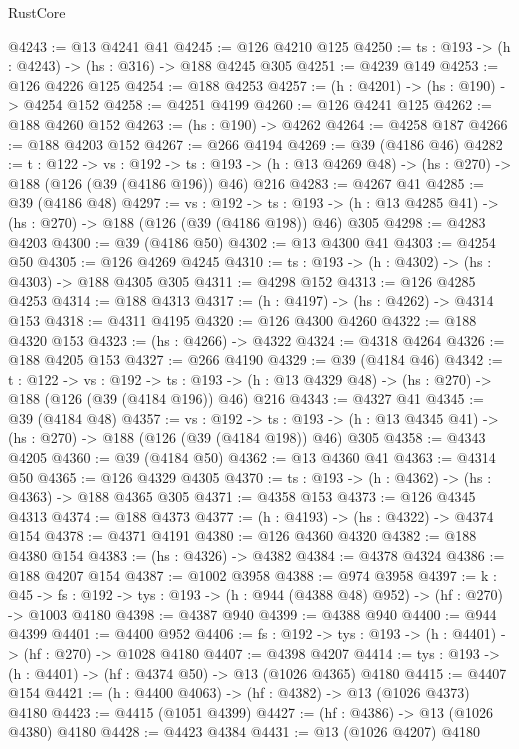 \begin{lexlean}{RustCore}
\begin{coremodule}
@4243 := @13 @4241 @41
@4245 := @126 @4210 @125
@4250 := {ts : @193} -> (h : @4243) -> (hs : @316) -> @188 @4245 @305
@4251 := @4239 @149
@4253 := @126 @4226 @125
@4254 := @188 @4253
@4257 := (h : @4201) -> (hs : @190) -> @4254 @152
@4258 := @4251 @4199
@4260 := @126 @4241 @125
@4262 := @188 @4260 @152
@4263 := (hs : @190) -> @4262
@4264 := @4258 @187
@4266 := @188 @4203 @152
@4267 := @266 @4194
@4269 := @39 (@4186 @46)
@4282 := {t : @122} ->
  {vs : @192} ->
  {ts : @193} -> (h : @13 @4269 @48) -> (hs : @270) -> @188 (@126 (@39 (@4186 @196)) @46) @216
@4283 := @4267 @41
@4285 := @39 (@4186 @48)
@4297 := {vs : @192} ->
  {ts : @193} -> (h : @13 @4285 @41) -> (hs : @270) -> @188 (@126 (@39 (@4186 @198)) @46) @305
@4298 := @4283 @4203
@4300 := @39 (@4186 @50)
@4302 := @13 @4300 @41
@4303 := @4254 @50
@4305 := @126 @4269 @4245
@4310 := {ts : @193} -> (h : @4302) -> (hs : @4303) -> @188 @4305 @305
@4311 := @4298 @152
@4313 := @126 @4285 @4253
@4314 := @188 @4313
@4317 := (h : @4197) -> (hs : @4262) -> @4314 @153
@4318 := @4311 @4195
@4320 := @126 @4300 @4260
@4322 := @188 @4320 @153
@4323 := (hs : @4266) -> @4322
@4324 := @4318 @4264
@4326 := @188 @4205 @153
@4327 := @266 @4190
@4329 := @39 (@4184 @46)
@4342 := {t : @122} ->
  {vs : @192} ->
  {ts : @193} -> (h : @13 @4329 @48) -> (hs : @270) -> @188 (@126 (@39 (@4184 @196)) @46) @216
@4343 := @4327 @41
@4345 := @39 (@4184 @48)
@4357 := {vs : @192} ->
  {ts : @193} -> (h : @13 @4345 @41) -> (hs : @270) -> @188 (@126 (@39 (@4184 @198)) @46) @305
@4358 := @4343 @4205
@4360 := @39 (@4184 @50)
@4362 := @13 @4360 @41
@4363 := @4314 @50
@4365 := @126 @4329 @4305
@4370 := {ts : @193} -> (h : @4362) -> (hs : @4363) -> @188 @4365 @305
@4371 := @4358 @153
@4373 := @126 @4345 @4313
@4374 := @188 @4373
@4377 := (h : @4193) -> (hs : @4322) -> @4374 @154
@4378 := @4371 @4191
@4380 := @126 @4360 @4320
@4382 := @188 @4380 @154
@4383 := (hs : @4326) -> @4382
@4384 := @4378 @4324
@4386 := @188 @4207 @154
@4387 := @1002 @3958
@4388 := @974 @3958
@4397 := {k : @45} ->
  {fs : @192} -> {tys : @193} -> (h : @944 (@4388 @48) @952) -> (hf : @270) -> @1003 @4180
@4398 := @4387 @940
@4399 := @4388 @940
@4400 := @944 @4399
@4401 := @4400 @952
@4406 := {fs : @192} -> {tys : @193} -> (h : @4401) -> (hf : @270) -> @1028 @4180
@4407 := @4398 @4207
@4414 := {tys : @193} -> (h : @4401) -> (hf : @4374 @50) -> @13 (@1026 @4365) @4180
@4415 := @4407 @154
@4421 := (h : @4400 @4063) -> (hf : @4382) -> @13 (@1026 @4373) @4180
@4423 := @4415 (@1051 @4399)
@4427 := (hf : @4386) -> @13 (@1026 @4380) @4180
@4428 := @4423 @4384
@4431 := @13 (@1026 @4207) @4180

\end{coremodule}
\end{lexlean}
